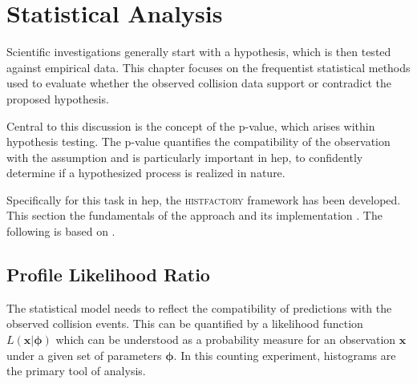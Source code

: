 \chapter{Statistical Analysis}\label{sec:statistics}
Scientific investigations generally start with a hypothesis, which is then tested against empirical data. This chapter focuses on the frequentist statistical methods used to evaluate whether the observed collision data support or contradict the proposed hypothesis.

Central to this discussion is the concept of the p-value, which arises within hypothesis testing. The p-value quantifies the compatibility of the observation with the assumption and is particularly important in \ac{hep}, to confidently determine if a hypothesized process is realized in nature.

Specifically for this task in \ac{hep}, the \textsc{histfactory} framework has been developed. This section the fundamentals of the approach and its implementation \citep{pyhf,pyhf_joss}. The following is based on \citep{cowan2011asymptotic,behnke2013data,pyhf}.



\section{Profile Likelihood Ratio}\label{sec:likelihood}
The statistical model needs to reflect the compatibility of predictions with the observed collision events. This can be quantified by a likelihood function $L(\bm{x} | \bm{\phi})$ which can be understood as a probability measure for an observation $\bm{x}$ under a given set of parameters $\bm{\phi}$. In this counting experiment, histograms are the primary tool of analysis.


